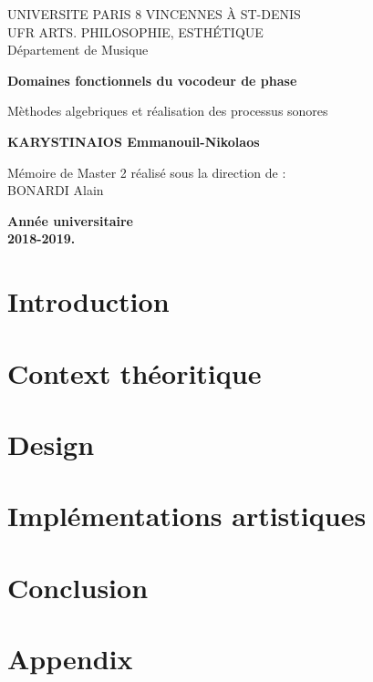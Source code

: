 \documentclass[a4paper,12pt,twoside]{report}
\author{KARYSTINAIOS Emmanouil Nikolaos}
\begin{document}
% 
\begin{titlepage}
    \begin{center}
        UNIVERSITE PARIS 8 VINCENNES À ST-DENIS \\
        UFR ARTS. PHILOSOPHIE, ESTHÉTIQUE \\
        Département de Musique
        \vspace*{7cm}
        
        \textbf{\Large{Domaines fonctionnels du vocodeur de phase}}
        
        \vspace{0.5cm}
        Mèthodes algebriques et réalisation des processus sonores
        
        \vspace{3cm}
        
        \textbf{KARYSTINAIOS Emmanouil-Nikolaos}
        
        \vspace{4cm}    

        Mémoire de Master 2 réalisé sous la direction de : \\
        BONARDI Alain 

        \vspace{3cm}
        
        \textbf{Année universitaire \\ 2018-2019.}
        
        
        
        
        
    \end{center}
\end{titlepage}
\preface


\body
\chapter{Introduction}

\chapter{Context théoritique}

\chapter{Design}

\chapter{Implémentations artistiques}

\chapter{Conclusion}

\appendix
\chapter*{Appendix}

\lstlistoflistings 




\nocite{*}
\end{document}
